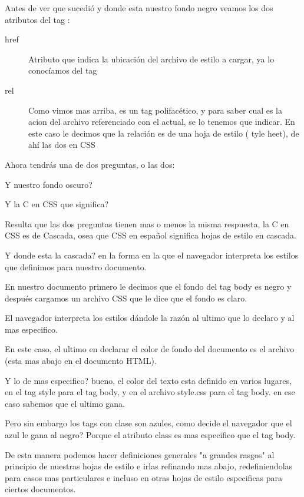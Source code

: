\documentclass[letterpaper,10pt,spanish]{sphinxmanual}
\begin{document}
Antes de ver que sucedió y donde esta nuestro fondo negro veamos los dos
atributos del tag :
\begin{description}
\item[{href}] \leavevmode
Atributo que indica la ubicación del archivo de estilo a cargar, ya lo conocíamos del tag 

\item[{rel}] \leavevmode
Como vimos mas arriba,  es un tag polifacético, y para saber cual es la  acion del archivo referenciado con el actual, se lo tenemos que indicar.
En este caso le decimos que la relación es de una hoja de estilo ( tyle  heet), de ahí las dos  en CSS

\end{description}

Ahora tendrás una de dos preguntas, o las dos:

Y nuestro fondo oscuro?

Y la C en CSS que significa?

Resulta que las dos preguntas tienen mas o menos la misma respuesta, la C en
CSS es de Cascada, osea que CSS en español significa hojas de estilo en
cascada.

Y donde esta la cascada? en la forma en la que el navegador interpreta los
estilos que definimos para nuestro documento.

En nuestro documento primero le decimos que el fondo del tag body es negro y
después cargamos un archivo CSS que le dice que el fondo es claro.

El navegador interpreta los estilos dándole la razón al ultimo que lo declaro y
al mas especifico.

En este caso, el ultimo en declarar el color de fondo del documento es el archivo (esta mas abajo en el documento HTML).

Y lo de mas especifico? bueno, el color del texto esta definido en varios lugares,
en el tag style para el tag body, y en el archivo style.css para el tag body. en ese caso sabemos que el ultimo gana.

Pero sin embargo los tags con clase  son azules, como decide el
navegador que el azul le gana al negro? Porque el atributo class es mas
especifico que el tag body.

De esta manera podemos hacer definiciones generales "a grandes rasgos" al
principio de nuestras hojas de estilo e irlas refinando mas abajo,
redefiniendolas para casos mas particulares e incluso en otras hojas de estilo
especificas para ciertos documentos.
\end{document}
